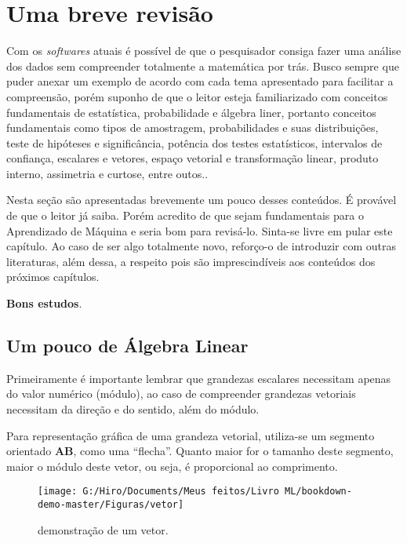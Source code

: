 \documentclass[
  openany]{book}
\begin{document}
\hypertarget{dicio}{%
\chapter{Uma breve revisão}\label{dicio}}

Com os \emph{softwares} atuais é possível de que o pesquisador consiga fazer uma análise dos dados sem compreender totalmente a matemática por trás. Busco sempre que puder anexar um exemplo de acordo com cada tema apresentado para facilitar a compreensão, porém suponho de que o leitor esteja familiarizado com conceitos fundamentais de estatística, probabilidade e álgebra liner, portanto conceitos fundamentais como tipos de amostragem, probabilidades e suas distribuições, teste de hipóteses e significância, potência dos testes estatísticos, intervalos de confiança, escalares e vetores, espaço vetorial e transformação linear, produto interno, assimetria e curtose, entre outos..

Nesta seção são apresentadas brevemente um pouco desses conteúdos. É provável de que o leitor já saiba. Porém acredito de que sejam fundamentais para o Aprendizado de Máquina e seria bom para revisá-lo. Sinta-se livre em pular este capítulo. Ao caso de ser algo totalmente novo, reforço-o de introduzir com outras literaturas, além dessa, a respeito pois são imprescindíveis aos conteúdos dos próximos capítulos.

\textbf{Bons estudos}.

\hypertarget{um-pouco-de-uxe1lgebra-linear}{%
\section{Um pouco de Álgebra Linear}\label{um-pouco-de-uxe1lgebra-linear}}

Primeiramente é importante lembrar que grandezas escalares necessitam apenas do valor numérico (módulo), ao caso de compreender grandezas vetoriais necessitam da direção e do sentido, além do módulo.

Para representação gráfica de uma grandeza vetorial, utiliza-se um segmento orientado \textbf{AB}, como uma ``flecha''. Quanto maior for o tamanho deste segmento, maior o módulo deste vetor, ou seja, é proporcional ao comprimento.

\begin{figure}

{\centering \texttt{[image: G:/Hiro/Documents/Meus feitos/Livro ML/bookdown-demo-master/Figuras/vetor]} 

}

\caption{demonstração de um vetor.}\label{fig:vetor}
\end{figure}
\end{document}
